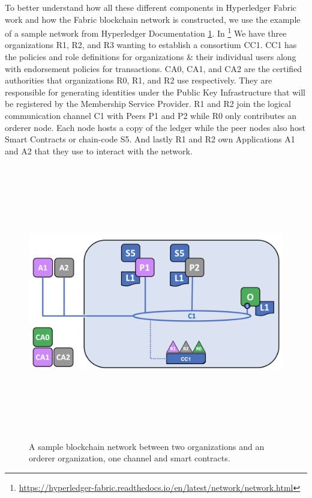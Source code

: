 To better understand how all these different components in Hyperledger Fabric work and how the Fabric blockchain network is constructed, we use the example of a sample network from Hyperledger Documentation \ref{fig:hyperledger-sample-network}. In  \footnote{\url{https://hyperledger-fabric.readthedocs.io/en/latest/network/network.html}} We have three organizations R1, R2, and R3 wanting to establish a consortium CC1. CC1 has the policies and role definitions for organizations \& their individual users along with endorsement policies for transactions. CA0, CA1, and CA2 are the certified authorities that organizations R0, R1, and R2 use respectively. They are responsible for generating identities under the Public Key Infrastructure that will be registered by the Membership Service Provider. R1 and R2 join the logical communication channel C1 with Peers P1 and P2 while R0 only contributes an orderer node. Each node hosts a copy of the ledger while the peer nodes also host Smart Contracts or chain-code S5. And lastly R1 and R2 own Applications A1 and A2 that they use to interact with the network.

\begin{figure}
    \centering
    \includegraphics[width=12cm,height=12cm,keepaspectratio]{photos/network.diagram.1.png}
    \caption{A sample blockchain network between two organizations and an orderer organization, one channel and smart contracts.}
    \label{fig:hyperledger-sample-network}
\end{figure}

